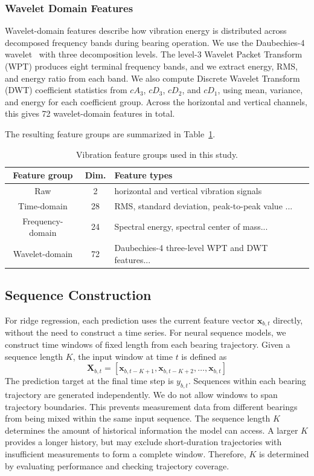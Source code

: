\documentclass{article}
\begin{document}
\subsubsection{Wavelet Domain Features}

Wavelet-domain features describe how vibration energy is distributed across decomposed frequency bands during bearing operation.
We use the Daubechies-4 wavelet~\cite{daubechies1988orthonormal} with three decomposition levels.
The level-3 Wavelet Packet Transform (WPT) produces eight terminal frequency bands, and we extract energy, RMS, and energy ratio from each band.
We also compute Discrete Wavelet Transform (DWT) coefficient statistics from $cA_3$, $cD_3$, $cD_2$, and $cD_1$, using mean, variance, and energy for each coefficient group.
Across the horizontal and vertical channels, this gives 72 wavelet-domain features in total.

The resulting feature groups are summarized in Table~\ref{tab:feature_groups}.
\begin{table}[ht]
\centering
\caption{Vibration feature groups used in this study.}
\label{tab:feature_groups}
\begin{tabular}{c c p{7.2cm}}
\hline
Feature group & Dim. & Feature types \\
\hline
Raw & 2 &  horizontal and vertical vibration signals \\
Time-domain & 28 & RMS, standard deviation, peak-to-peak value ... \\
Frequency-domain & 24 & Spectral energy, spectral center of mass... \\
Wavelet-domain & 72 & Daubechies-4 three-level WPT and DWT features... \\
\hline
\end{tabular}
\end{table}


\subsection{Sequence Construction}
For ridge regression, each prediction uses the current feature vector $\mathbf{x}_{b,t}$ directly, without the need to construct a time series.
For neural sequence models, we construct time windows of fixed length from each bearing trajectory.
Given a sequence length $K$, the input window at time $t$ is defined as\[
\mathbf{X}_{b,t} =
[\mathbf{x}_{b,t-K+1}, \mathbf{x}_{b,t-K+2}, \ldots, \mathbf{x}_{b,t}]\]
The prediction target at the final time step is $y_{b,t}$.
Sequences within each bearing trajectory are generated independently.
We do not allow windows to span trajectory boundaries.
This prevents measurement data from different bearings from being mixed within the same input sequence.
The sequence length $K$ determines the amount of historical information the model can access.
A larger $K$ provides a longer history, but may exclude short-duration trajectories with insufficient measurements to form a complete window.
Therefore, $K$ is determined by evaluating performance and checking trajectory coverage.
\end{document}
